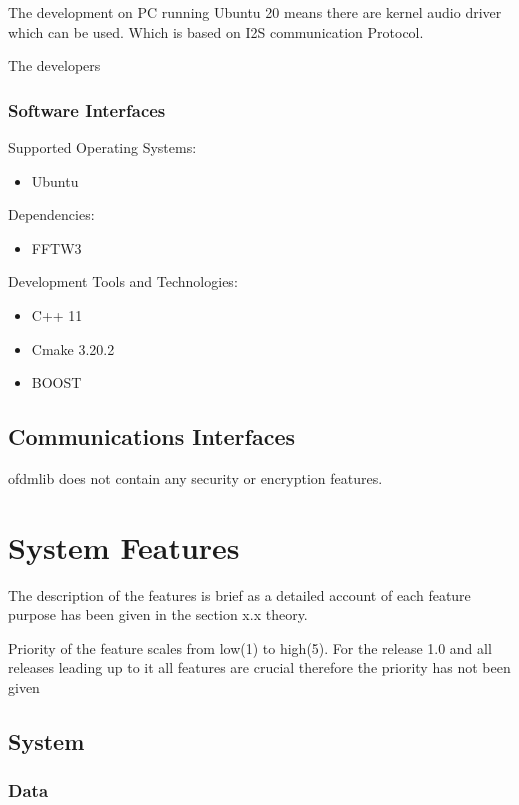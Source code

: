 \documentclass[]{report}
\begin{document}
The development on PC running Ubuntu 20 means there are kernel audio driver which can be used. Which is based on I2S communication Protocol.

The developers 

\subsubsection{Software Interfaces}


Supported Operating Systems:

\begin{itemize}
	\item Ubuntu
\end{itemize}

Dependencies:

\begin{itemize}
	\item FFTW3
\end{itemize}\textbf{}

Development Tools and Technologies:
\begin{itemize}
	\item C++ 11
	\item Cmake 3.20.2
	\item BOOST
\end{itemize}\textbf{}


\subsection{Communications Interfaces}

ofdmlib does not contain any security or encryption features.


\pagebreak
\section{System Features}

The description of the features is brief as a detailed account of each feature purpose has been given in the section x.x theory.

Priority of the feature scales from low(1) to high(5).
For the release 1.0 and all releases leading up to it all features are crucial therefore the priority has not been given

\subsection{System}

\subsubsection{Data}
\end{document}
